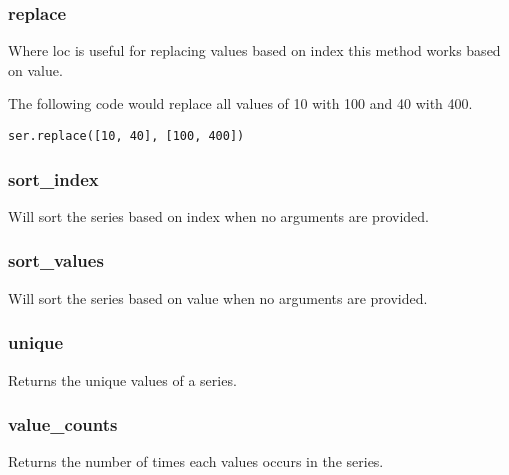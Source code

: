 %
\subsubsection{replace}
Where loc is useful for replacing values based on index this method works based
on value.

The following code would replace all values of 10 with 100 and 40 with 400.
\begin{lstlisting}
ser.replace([10, 40], [100, 400])
\end{lstlisting}

%
\subsubsection{sort\_index}
Will sort the series based on index when no arguments are provided.

%
\subsubsection{sort\_values}
Will sort the series based on value when no arguments are provided.

%
\subsubsection{unique}
Returns the unique values of a series.

%
\subsubsection{value\_counts}
Returns the number of times each values occurs in the series.
